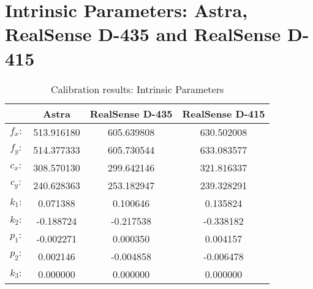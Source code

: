 \appendix
\chapter*{Intrinsic Parameters: Astra, RealSense D-435 and RealSense D-415}
\label{chap:intpara}


\begin{table}[ht]
\renewcommand{\arraystretch}{1.3}
\caption{Calibration results: Intrinsic Parameters}
\label{absolute}
\centering
\begin{tabular}{|c|c|c|c|}
\hline
&Astra&RealSense D-435 & RealSense D-415\\
\hline
$f_{x}:$&513.916180  &605.639808 &630.502008\\
$f_{y}:$&514.377333  &605.730544 &633.083577\\
$c_{x}:$&308.570130  &299.642146 &321.816337\\
$c_{y}:$&240.628363  &253.182947 &239.328291\\
$k_{1}:$&0.071388    &0.100646   &0.135824\\
$k_{2}:$&-0.188724   &-0.217538  &-0.338182\\
$p_{1}:$&-0.002271   &0.000350   &0.004157\\
$p_{2}:$&0.002146    &-0.004858  &-0.006478\\
$k_{3}:$&0.000000    &0.000000   &0.000000\\
\hline
\end{tabular}
\end{table}



\iffalse
 &Focal lenght & Principal Point STD &\\
\hline
Astra &$f_{x}:$ 513.916  $f_{y}:$ 514.377 & $x_{0}:$ 308.570  $y_{0}:$ 240.628 \\
\hline
RealSense D-435 & 0.001 & 0.001  \\
\hline
Distortion coefficients \\
\hline
0.071388, -0.188724, -0.002271, 0.002146, 0.000000
\hline
\fi
